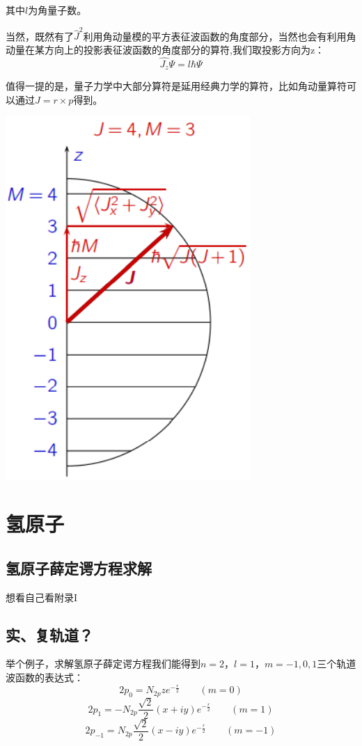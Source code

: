 其中$l$为角量子数。

当然，既然有了$\hat{J}^2$利用角动量模的平方表征波函数的角度部分，当然也会有利用角动量在某方向上的投影表征波函数的角度部分的算符,我们取投影方向为z：
\[\hat{J_z}\varPsi=l\hbar\varPsi\]

值得一提的是，量子力学中大部分算符是延用经典力学的算符，比如角动量算符可以通过$J=r \times p$得到。
 
\begin{center}
    \includegraphics[scale=0.5]{fig/lzhx/微信图片_20211026130340.png}
\end{center}

\section{氢原子}
\subsection{氢原子薛定谔方程求解}
想看自己看附录I

\subsection{实、复轨道？}
举个例子，求解氢原子薛定谔方程我们能得到$n=2$，$l=1$，$m=-1,0,1$三个轨道波函数的表达式：
\[2p_0=N_{2p}ze^{-\frac{r}{2}} \qquad (m=0)\]
\[2p_1=-N_{2p}\frac{\sqrt{2}}{2}(x+iy)e^{-\frac{r}{2}} \qquad (m=1) \]
\[2p_{-1}=N_{2p}\frac{\sqrt{2}}{2}(x-iy)e^{-\frac{r}{2}} \qquad (m=-1) \]

